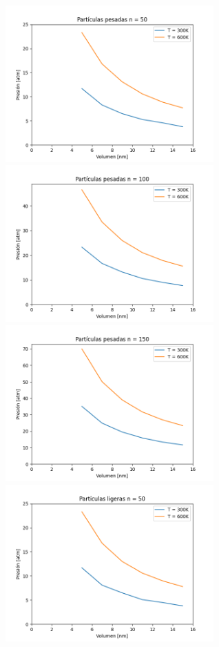 \documentclass[a4paper, 12p]{article}
\begin{document}
\begin{figure}[H]
    \begin{subfigure}
    		\raggedright
     	\includegraphics[width=8cm, height=6cm]{graficos/grafico1.pdf}
    \end{subfigure}
    	\begin{subfigure}
    		\raggedright
    		\includegraphics[width=8cm, height=6cm]{graficos/grafico2.pdf}
    	\end{subfigure}
    \begin{subfigure}
    		\raggedright
    		\includegraphics[width=8cm, height=6cm]{graficos/grafico3.pdf}
    	\end{subfigure}
    	\begin{subfigure}
    		\raggedright
    		\includegraphics[width=8cm, height=6cm]{graficos/grafico4.pdf}

\end{subfigure}
\end{figure}
\end{document}

